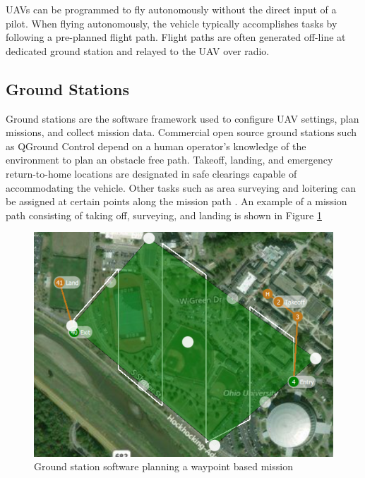 \documentclass[numbered,pdftex]{ohio-etd}
\begin{document}
UAVs can be programmed to fly autonomously without the direct input of a pilot. When flying autonomously, the vehicle typically accomplishes tasks by following a pre-planned flight path. Flight paths are often generated off-line at dedicated ground station and relayed to the UAV over radio. 

\subsection{Ground Stations}
Ground stations are the software framework used to configure UAV settings, plan missions, and collect mission data. Commercial open source ground stations such as QGround Control \cite{qgc} depend on a human operator's knowledge of the environment to plan an obstacle free path. Takeoff, landing, and emergency return-to-home locations are designated in safe clearings capable of accommodating the vehicle. Other tasks such as area surveying and loitering can be assigned at certain points along the mission path \cite{wilhelm_direct_2017}. An example of a mission path consisting of taking off, surveying, and landing is shown in Figure \ref{fig:groundstationplanning}




\begin{figure}[H]
	\centering
	\includegraphics[width=12cm]{PaperFigures/Literature/groundStationPlanning}
	\caption{Ground station software planning a waypoint based mission}
	\label{fig:groundstationplanning}
\end{figure}
\end{document}
